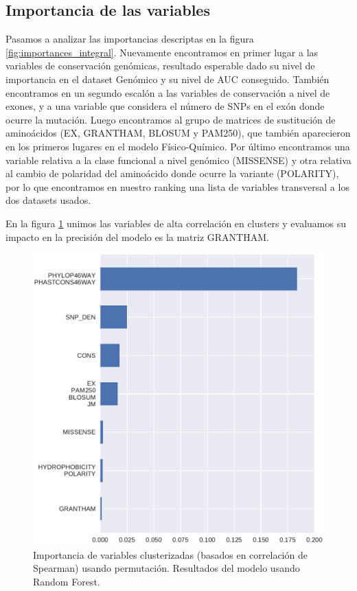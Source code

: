 \subsection{Importancia de las variables}

Pasamos a analizar las importancias descriptas en la figura \ref{fig:importances_integral}. Nuevamente encontramos en primer lugar a las variables de conservación genómicas, resultado esperable dado su nivel de importancia en el dataset Genómico y su nivel de AUC conseguido. También encontramos en un segundo escalón a las variables de conservación a nivel de exones, y a una variable que considera el número de SNPs en el exón donde ocurre la mutación. Luego encontramos al grupo de matrices de sustitución de aminoácidos (EX, GRANTHAM, BLOSUM y PAM250), que también aparecieron en los primeros lugares en el modelo Físico-Químico. Por último encontramos una variable relativa a la clase funcional a nivel genómico (MISSENSE) y otra relativa al cambio de polaridad del aminoácido donde ocurre la variante (POLARITY), por lo que encontramos en nuestro ranking una lista de variables transversal a los dos datasets usados. 

En la figura \ref{fig:importance_cluster_integral} unimos las variables de alta correlación en clusters y evaluamos su impacto en la precisión del modelo es la matriz GRANTHAM.





\begin{figure}[H]
    \centering
    \includegraphics[scale=0.8]{documents/latex/figures/3/integral/integral_importance_cluster.pdf}
    \caption{Importancia de variables clusterizadas (basados en correlación de Spearman) usando permutación. Resultados del modelo usando Random Forest.}
    \label{fig:importance_cluster_integral}
\end{figure}

